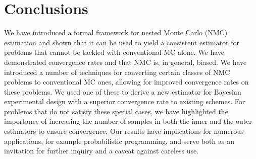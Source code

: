 
\section{Conclusions}

We have introduced a formal framework for nested Monte Carlo (NMC) estimation and shown that
it can be used to yield a consistent estimator for problems that cannot be tackled
with conventional MC alone.  We have demonstrated convergence rates and that NMC
is, in general, biased. We have introduced a number of techniques for converting certain classes
of NMC problems to conventional MC ones, allowing for improved convergence rates on these problems.
We used one of these to derive a new estimator for Bayesian experimental design
with a superior convergence rate to existing schemes.  For problems that do not satisfy these special
cases, we have highlighted the importance of increasing the number of samples in both the inner
and the outer estimators to ensure convergence.  Our results have implications for numerous
applications, for example probabilistic programming, and serve both as an invitation for further inquiry 
and a caveat against careless use.


